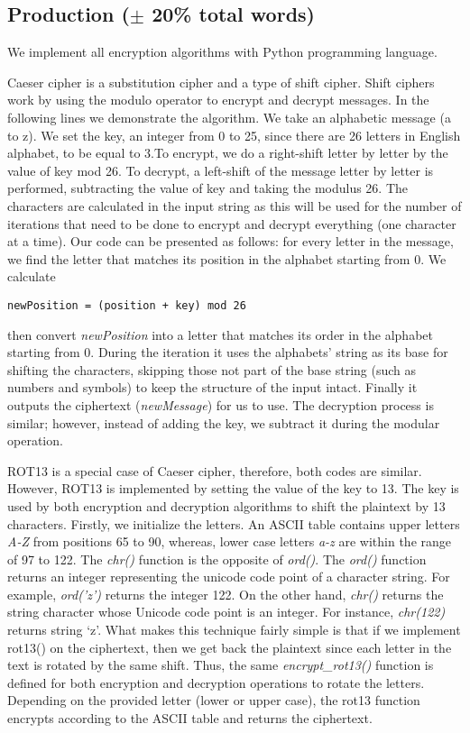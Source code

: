 \subsection{Production ($\pm$ 20\% total words)}

We implement all encryption algorithms with Python programming language. 

Caeser cipher is a substitution cipher and a type of shift cipher. Shift ciphers work by using the modulo operator to encrypt and decrypt messages. In the following lines we demonstrate the algorithm. We take an alphabetic message (a to z). We set the key, an integer from 0 to 25, since there are 26 letters in English alphabet, to be equal to 3.To encrypt, we do a right-shift letter by letter by the value of key mod 26. To decrypt, a left-shift of the message letter by letter is performed, subtracting the value of key and taking the modulus 26. The characters are calculated in the input string as this will be used for the number of iterations that need to be done to encrypt and decrypt everything (one character at a time). Our code can be presented as follows: for every letter in the message, we find the letter that matches its position in the alphabet starting from 0. We calculate
\begin{verbatim}
newPosition = (position + key) mod 26
\end{verbatim} 
then convert \textit{newPosition} into a letter that matches its order in the alphabet starting from 0. During the iteration it uses the alphabets' string as its base for shifting the characters, skipping those not part of the base string (such as numbers and symbols) to keep the structure of the input intact.
Finally it outputs the ciphertext (\textit{newMessage}) for us to use. The decryption process is similar; however, instead of adding the key, we subtract it during the modular operation.

ROT13 is a special case of Caeser cipher, therefore, both codes are similar. However, ROT13 is implemented by setting the value of the key to 13. The key is used by both encryption and decryption algorithms to shift the plaintext by 13 characters. Firstly, we initialize the letters. An ASCII table contains upper letters \textit{A-Z} from positions 65 to 90, whereas, lower case letters \textit{a-z} are within the range of 97 to 122. The \textit{chr()} function is the opposite of \textit{ord()}. The \textit{ord()} function returns an integer representing the unicode code point of a character string. For example, \textit{ord('z')} returns the integer 122. On the other hand, \textit{chr()} returns the string character whose Unicode code point is an integer. For instance, \textit{chr(122)} returns string ‘z’. What makes this technique fairly simple is that if we implement rot13() on the ciphertext, then we get back the plaintext since each letter in the text is rotated by the same shift. Thus, the same \textit{encrypt\_rot13()} function is defined for both encryption and decryption operations to rotate the letters. Depending on the provided letter (lower or upper case), the rot13 function encrypts according to the ASCII table and returns the ciphertext. 

